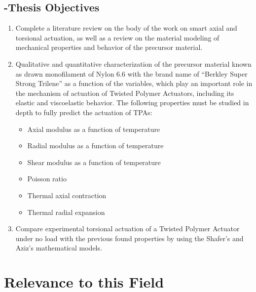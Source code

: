 \documentclass[12pt,oneside]{article}
\begin{document}
\subsection*{-Thesis Objectives}
\begin{enumerate}
	\item Complete a literature review on the body of the work on 		smart axial and torsional actuation, as well as a review on the material 		modeling of mechanical properties and behavior of the precursor material.
	\item Qualitative and quantitative characterization of the precursor 			material known as drawn monofilament of Nylon 6.6 with the brand name of ``Berkley Super Strong Trilene'' as a function of the variables, which play an important role in 		the mechanism of actuation of Twisted Polymer Actuators, including its 			elastic and viscoelastic behavior. The following properties must be 			studied in depth to fully predict the actuation of TPAs:
	
	\begin{itemize}
	 		\item Axial modulus as a function of temperature
			\item Radial modulus as a function of temperature
			\item Shear modulus as a function of temperature
			\item Poisson ratio
			\item Thermal axial contraction
			\item Thermal radial expansion
	\end{itemize}
	\item Compare experimental torsional actuation of a Twisted Polymer 			Actuator under no load with the previous found properties by using the Shafer's 	and Aziz's mathematical models. 	
\end{enumerate}


\section*{Relevance to this Field}
\end{document}
